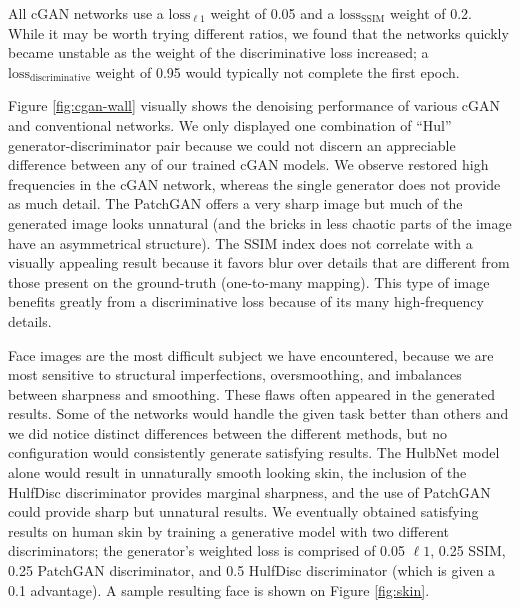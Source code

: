 All \ac{cGAN} networks use a $\text{loss}_{\ell 1}$ weight of 0.05 and a $\text{loss}_\text{SSIM}$ weight of 0.2. While it may be worth trying different ratios, we found that the networks quickly became unstable as the weight of the discriminative loss increased; a $\text{loss}_\text{discriminative}$ weight of 0.95 would typically not complete the first epoch.

Figure \ref{fig:cgan-wall} visually shows the denoising performance of various \ac{cGAN} and conventional networks. We only displayed one combination of ``Hul'' generator-discriminator pair because we could not discern an appreciable difference between any of our trained \ac{cGAN} models. We observe restored high frequencies in the \ac{cGAN} network, whereas the single generator does not provide as much detail. The PatchGAN offers a very sharp image but much of the generated image looks unnatural (and the bricks in less chaotic parts of the image have an asymmetrical structure). The SSIM index does not correlate with a visually appealing result because it favors blur over details that are different from those present on the ground-truth (one-to-many mapping). This type of image benefits greatly from a discriminative loss because of its many high-frequency details.

Face images are the most difficult subject we have encountered, because we are most sensitive to structural imperfections, oversmoothing, and imbalances between sharpness and smoothing. These flaws often appeared in the generated results. Some of the networks would handle the given task better than others and we did notice distinct differences between the different methods, but no configuration would consistently generate satisfying results. The HulbNet model alone would result in unnaturally smooth looking skin, the inclusion of the HulfDisc discriminator provides marginal sharpness, and the use of PatchGAN could provide sharp but unnatural results. We eventually obtained satisfying results on human skin by training a generative model with two different discriminators; the generator's weighted loss is comprised of 0.05 $\ell 1$, 0.25 \ac{SSIM}, 0.25 PatchGAN discriminator, and 0.5 HulfDisc discriminator (which is given a 0.1 advantage). A sample resulting face is shown on Figure \ref{fig:skin}.




